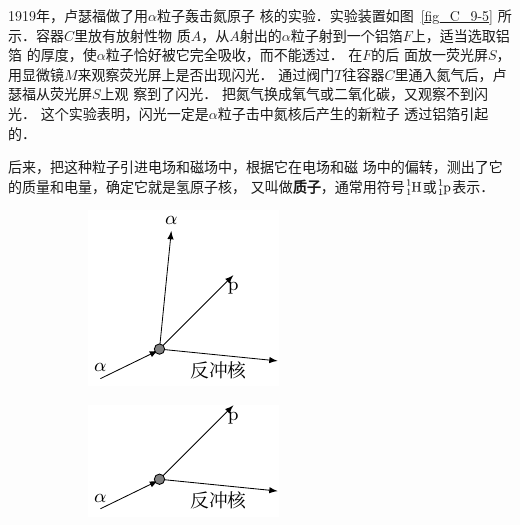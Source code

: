 1919年，卢瑟福做了用$\alpha$粒子轰击氮原子
核的实验．实验装置如图~\ref{fig_C_9-5} 所示．容器$C$里放有放射性物
质$A$，从$A$射出的$\alpha$粒子射到一个铝箔$F$上，适当选取铝箔
的厚度，使$\alpha$粒子恰好被它完全吸收，而不能透过．
在$F$的后
面放一荧光屏$S$，用显微镜$M$来观察荧光屏上是否出现闪光．
通过阀门$T$往容器$C$里通入氮气后，卢瑟福从荧光屏$S$上观
察到了闪光．
把氮气换成氧气或二氧化碳，又观察不到闪光．
这个实验表明，闪光一定是$\alpha$粒子击中氮核后产生的新粒子
透过铝箔引起的．

后来，把这种粒子引进电场和磁场中，根据它在电场和磁
场中的偏转，测出了它的质量和电量，确定它就是氢原子核，
又叫做\textbf{质子}，通常用符号$\atom{H}{1}{1}$或$\atom{p}{1}{1}$表示．
\begin{figure}[htbp]
    \centering
    \begin{subfigure}{0.3\linewidth}
        \centering
        \includegraphics{fig/C/9-6a.pdf}
        \caption{}\label{fig_C_9-6a}
    \end{subfigure}
    \hfil
    \begin{subfigure}{0.3\linewidth}
        \centering
        \includegraphics{fig/C/9-6b.pdf}
        \caption{}\label{fig_C_9-6b}
    \end{subfigure}
    \caption{}\label{fig_C_9-6}
\end{figure}


